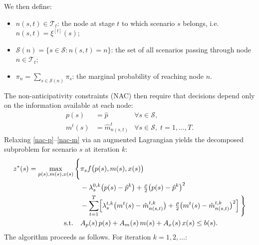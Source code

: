 \documentclass[trsc,nonblindrev]{informs3noheader}
\begin{document}
We then define:
\begin{itemize}
    \item $n(s,t)\in\mathcal{T}_t$: the node at stage $t$ to which 
          scenario $s$ belongs, i.e.\ $n(s,t)=\xi^{[t]}(s)$;
    \item $\mathcal{S}(n)=\{s\in\mathcal{S}: n(s,t)=n\}$: the set 
          of all scenarios passing through node $n\in\mathcal{T}_t$;
    \item $\pi_n = \sum_{s\in\mathcal{S}(n)}\pi_s$: the marginal 
          probability of reaching node $n$.
\end{itemize}
The non-anticipativity constraints (NAC) then require that decisions 
depend only on the information available at each node:
\begin{align}
    p(s) &= \hat{p} 
    & \forall s\in\mathcal{S}, \label{nac-p}\\
    m^t(s) &= \hat{m}^t_{n(s,t)} 
    & \forall s\in\mathcal{S},\; t=1,\ldots,T. \label{nac-m}
\end{align}
Relaxing \eqref{nac-p}--\eqref{nac-m} via an augmented Lagrangian 
yields the decomposed subproblem for scenario $s$ at iteration $k$:
\begin{align}
    z^*(s) = \max_{p(s),m(s),x(s)} \Bigg\{
    &\pi_s f\big(p(s),m(s),x(s)\big) \notag\\
    &-\lambda^{0,k}_s\big(p(s)-\hat{p}^k\big)
     +\tfrac{\rho}{2}\big(p(s)-\hat{p}^k\big)^2 \notag\\
    &-\sum_{t=1}^{T}\!\left[
        \lambda^{t,k}_s\big(m^t(s)-\hat{m}^{t,k}_{n(s,t)}\big)
       +\tfrac{\rho}{2}\big(m^t(s)-\hat{m}^{t,k}_{n(s,t)}\big)^2
      \right] \Bigg\} \notag\\
    \text{s.t.}\quad
    &A_p(s)\,p(s)+A_m(s)\,m(s)+A_x(s)\,x(s)\le b(s).
\end{align}
The algorithm proceeds as follows. For iteration $k=1,2,\ldots$:
\end{document}
